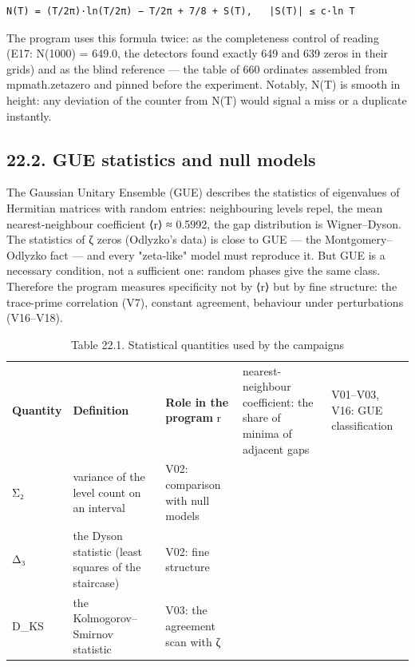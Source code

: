 \documentclass[11pt,a4paper]{article}
\begin{document}
\begin{verbatim}
N(T) = (T/2π)·ln(T/2π) − T/2π + 7/8 + S(T),   |S(T)| ≤ c·ln T
\end{verbatim}

The program uses this formula twice: as the completeness control of reading (E17: N(1000) = 649.0, the detectors found exactly 649 and 639 zeros in their grids) and as the blind reference — the table of 660 ordinates assembled from mpmath.zetazero and pinned before the experiment. Notably, N(T) is smooth in height: any deviation of the counter from N(T) would signal a miss or a duplicate instantly.

\subsection{22.2. GUE statistics and null models}

The Gaussian Unitary Ensemble (GUE) describes the statistics of eigenvalues of Hermitian matrices with random entries: neighbouring levels repel, the mean nearest-neighbour coefficient ⟨r⟩ ≈ 0.5992, the gap distribution is Wigner–Dyson. The statistics of ζ zeros (Odlyzko's data) is close to GUE — the Montgomery–Odlyzko fact — and every "zeta-like" model must reproduce it. But GUE is a necessary condition, not a sufficient one: random phases give the same class. Therefore the program measures specificity not by ⟨r⟩ but by fine structure: the trace-prime correlation (V7), constant agreement, behaviour under perturbations (V16–V18).

\begin{table}[htbp]\centering\small
\caption{Table 22.1. Statistical quantities used by the campaigns}
\begin{tabular}{p{} p{} p{}}
\toprule
\textbf{Quantity} & \textbf{Definition} & \textbf{Role in the program}
\midrule
r & nearest-neighbour coefficient: the share of minima of adjacent gaps & V01–V03, V16: GUE classification \\
Σ₂ & variance of the level count on an interval & V02: comparison with null models \\
Δ₃ & the Dyson statistic (least squares of the staircase) & V02: fine structure \\
D\_KS & the Kolmogorov–Smirnov statistic & V03: the agreement scan with ζ \\
\bottomrule
\end{tabular}
\end{table}
\end{document}
